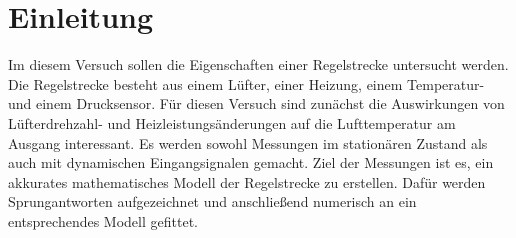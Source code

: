 \section{Einleitung}

Im diesem Versuch sollen die Eigenschaften einer Regelstrecke untersucht werden. Die Regelstrecke besteht aus einem Lüfter, einer Heizung, einem Temperatur- und einem Drucksensor. Für diesen Versuch sind zunächst die Auswirkungen von Lüfterdrehzahl- und Heizleistungsänderungen auf die Lufttemperatur am Ausgang interessant. Es werden sowohl Messungen im stationären Zustand als auch mit dynamischen Eingangsignalen gemacht. Ziel der Messungen ist es, ein akkurates mathematisches Modell der Regelstrecke zu erstellen. Dafür werden Sprungantworten aufgezeichnet und anschließend numerisch an ein entsprechendes Modell gefittet.




